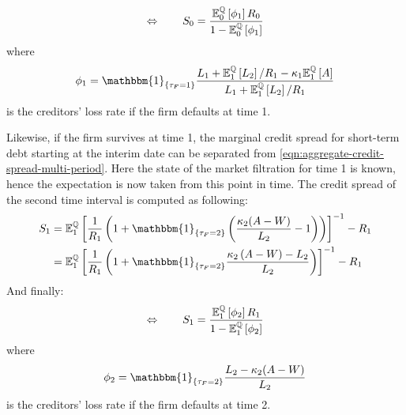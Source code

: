 \documentclass[main.tex]{subfiles}
\begin{document}
        \begin{equation}
            \Leftrightarrow \qquad
            S_0 =
            \frac{
                \mathbb{E}_{0}^{\mathbb{Q}}\left[\phi_1\right]R_0
            }{
                1 - \mathbb{E}_{0}^{\mathbb{Q}}\left[\phi_1\right] 
            }
        \end{equation}
        where
        \begin{equation}
            \phi_1 =
            \mathbbm{1}_{\{\tau_{F}=1\}}
            \frac{
                L_{1}+\mathbb{E}_{1}^{\rnmeasure}\left[L_{2}\right]/R_1 - \kappa_{1}\mathbb{E}_{1}^{\rnmeasure}\left[A\right]
            }{
                L_{1} + \mathbb{E}_{1}^{\rnmeasure}\left[L_{2}\right]/R_1
            }
        \end{equation}
        is the creditors' loss rate if the firm defaults at time 1.
        
        Likewise, if the firm survives at time 1, the marginal credit spread for short-term debt starting at the interim date can be separated from \cref{eqn:aggregate-credit-spread-multi-period}.
        Here the state of the market filtration for time 1 is known, hence the expectation is now taken from this point in time.
        The credit spread of the second time interval is computed as following:
        \begin{align}
            S_1 &=
            \mathbb{E}_{1}^{\rnmeasure}\left[
                \frac{1}{R_1} \left(
                    1
                    + \mathbbm{1}_{\{\tau_{F} = 2\}}\left(
                        \frac{\kappa_2 (A-W)}{L_2} - 1
                    \right)
                \right)
            \right]^{-1} - R_1
            \nonumber
            \\
            &=
            \mathbb{E}_{1}^{\rnmeasure}\left[
                \frac{1}{R_1} \left(
                    1
                    + \mathbbm{1}_{\{\tau_{F} = 2\}}
                    \frac{
                        \kappa_2 \left(A - W\right) - L_2
                    }{
                        L_2
                    }
                \right)
            \right]^{-1} - R_1
            \nonumber
        \end{align}
        And finally:
        \begin{equation}
            \Leftrightarrow \qquad
            S_1 =
            \frac{
                \mathbb{E}_{1}^{\mathbb{Q}}\left[\phi_2\right]R_1
            }{
                1 - \mathbb{E}_{1}^{\mathbb{Q}}\left[\phi_2\right] 
            }
        \end{equation}
        where
        \begin{equation}
            \phi_2 =
            \mathbbm{1}_{\{\tau_{F}=2\}}
            \frac{
                L_{2}-\kappa_{2}(A-W)
            }{
                L_{2}
            }
        \end{equation}
        is the creditors' loss rate if the firm defaults at time 2.
\end{document}
